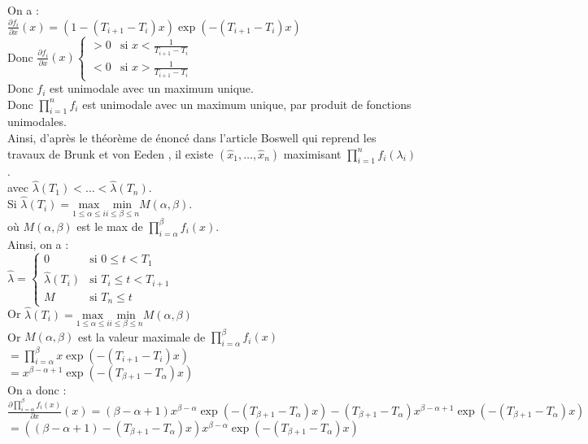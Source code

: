 \documentclass{journalstyle}
\begin{document}
On a : \\
$\frac{\partial f_i}{\partial x}(x) = (1 - (T_{i+1} - T_i) x) \exp(-(T_{i+1} - T_i) x)$ \\
Donc $\frac{\partial f_i}{\partial x}(x) \begin{cases}
    > 0 & \text{si } x < \frac{1}{T_{i+1} - T_i} \\
    < 0 & \text{si } x > \frac{1}{T_{i+1} - T_i}
\end{cases}$
\\
Donc $f_i$ est unimodale avec un maximum unique. \\
Donc $\prod_{i=1}^{n} f_i$ est unimodale avec un maximum unique, par produit de fonctions unimodales. \\
Ainsi, d'après le théorème de énoncé dans l'article Boswell \cite{Boswell1966} qui reprend les travaux de Brunk et von Eeden \cite{VanEeden1956}, 
il existe $(\hat{x}_1, \ldots, \hat{x}_n)$ maximisant $\prod_{i=1}^{n} f_i(\lambda_i)$. \\
avec $\hat{\lambda}(T_1) < \ldots < \hat{\lambda}(T_n)$. \\

Si $\hat{\lambda}(T_i) = \underset{1 \leq \alpha \leq i}{\text{max}} \underset{i \leq \beta \leq n}{\text{min}} M(\alpha, \beta)$. \\
où $M(\alpha, \beta)$ est le max de $\prod_{i=\alpha}^{\beta} f_i(x)$. \\

Ainsi, on a : \\
$\hat{\lambda} = \begin{cases}
    0 & \text{si } 0 \leq t < T_1 \\
    \hat{\lambda}(T_i) & \text{si } T_i \leq t < T_{i+1} \\
    M & \text{si } T_n \leq t
\end{cases}$ \\

Or $\hat{\lambda}(T_i) = \underset{1 \leq \alpha \leq i}{\text{max}} \underset{i \leq \beta \leq n}{\text{min}} M(\alpha, \beta)$ \\
Or $M(\alpha, \beta)$ est la valeur maximale de $\prod_{i=\alpha}^{\beta} f_i(x)$ \\
$ = \prod_{i=\alpha}^{\beta} x \exp(-(T_{i+1} - T_i) x)$ \\
$ = x^{\beta - \alpha + 1} \exp(-(T_{\beta + 1} - T_{\alpha})x)$ \\

On a donc : \\
$\frac{\partial \prod_{i=\alpha}^{\beta} f_i(x)}{\partial x}(x) = (\beta - \alpha + 1) x^{\beta - \alpha} \exp(-(T_{\beta + 1} - T_{\alpha})x) - (T_{\beta + 1} - T_{\alpha}) x^{\beta - \alpha + 1} \exp(-(T_{\beta + 1} - T_{\alpha})x)$ \\
$ = ((\beta - \alpha + 1) - (T_{\beta + 1} - T_{\alpha}) x) x^{\beta - \alpha} \exp(-(T_{\beta + 1} - T_{\alpha})x)$ \\
\end{document}
